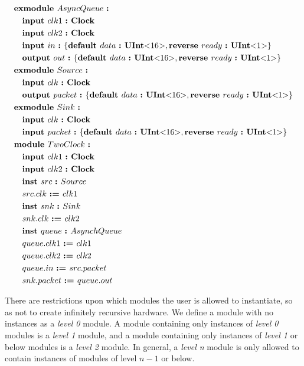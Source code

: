 \documentclass[12pt]{article}
\begin{document}
{ \fontsize{11pt}{1.15em}\selectfont
\[
\begin{aligned}
&\kw{exmodule} AsyncQueue \ \kws{:} \\
&\quad \kw{input} clk1 \ \kw{:} \kws{Clock} \\
&\quad \kw{input} clk2 \ \kw{:} \kws{Clock} \\
&\quad \kw{input} in  \ \kw{:} \bundleT{\kw{default} data \ \kw{:} \kws{UInt$<$}16\kws{$>$},\kw{reverse} ready \ \kw{:} \kws{UInt$<$}1\kws{$>$}} \\
&\quad \kw{output} out  \ \kw{:} \bundleT{\kw{default} data \ \kw{:} \kws{UInt$<$}16\kws{$>$},\kw{reverse} ready \ \kw{:} \kws{UInt$<$}1\kws{$>$}} \\
&\kw{exmodule} Source \ \kws{:} \\
&\quad \kw{input} clk \ \kw{:} \kws{Clock} \\
&\quad \kw{output} packet  \ \kw{:} \bundleT{\kw{default} data \ \kw{:} \kws{UInt$<$}16\kws{$>$},\kw{reverse} ready \ \kw{:} \kws{UInt$<$}1\kws{$>$}} \\
&\kw{exmodule} Sink \ \kws{:} \\
&\quad \kw{input} clk \ \kw{:} \kws{Clock} \\
&\quad \kw{input} packet  \ \kw{:} \bundleT{\kw{default} data \ \kw{:} \kws{UInt$<$}16\kws{$>$},\kw{reverse} ready \ \kw{:} \kws{UInt$<$}1\kws{$>$}} \\
&\kw{module} TwoClock \ \kws{:} \\
&\quad \kw{input} clk1 \ \kw{:} \kws{Clock} \\
&\quad \kw{input} clk2 \ \kw{:} \kws{Clock} \\
&\quad \kw{inst} src \ \kw{:} Source \\
&\quad src.clk \ \kw{:=} clk1 \\
&\quad \kw{inst} snk \ \kw{:} Sink \\
&\quad snk.clk \ \kw{:=} clk2 \\
&\quad \kw{inst} queue \ \kw{:} AsynchQueue \\
&\quad queue.clk1 \ \kw{:=} clk1 \\
&\quad queue.clk2 \ \kw{:=} clk2 \\
&\quad queue.in \ \kw{:=} src.packet \\
&\quad snk.packet \ \kw{:=} queue.out \\
\end{aligned}
\]
}

There are restrictions upon which modules the user is allowed to instantiate, so as not to create infinitely recursive hardware.
We define a module with no instances as a {\em level 0} module.
A module containing only instances of {\em level 0} modules is a {\em level 1} module, and a module containing only instances of {\em level 1} or below modules is a {\em level 2} module.
In general, a {\em level n} module is only allowed to contain instances of modules of level $n-1$ or below. 
\end{document}
